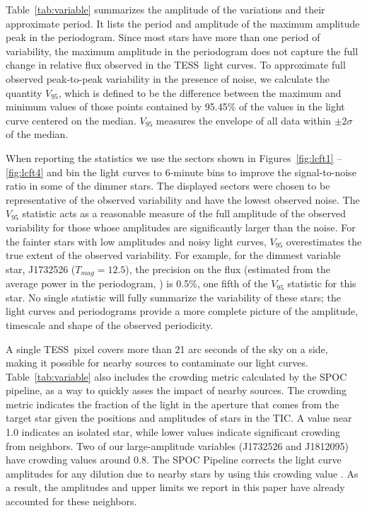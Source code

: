 \documentclass[twocolumn]{aastex631}
\newcommand{\tess}{TESS}
\begin{document}
Table~\ref{tab:variable} summarizes the amplitude of the variations and their approximate period.  It lists the period and amplitude of the maximum amplitude peak in the periodogram. Since most stars have more than one period of variability, the maximum amplitude in the periodogram does not capture the full change in relative flux observed in the \tess\ light curves. To approximate full observed peak-to-peak variability in the presence of noise, we calculate the quantity $V_{95}$, which is defined to be the difference between the maximum and minimum values of those points contained by 95.45\% of the values in the light curve centered on the median.  $V_{95}$ measures the envelope of all data within $\pm 2\sigma$ of the median. 


When reporting the statistics we use the sectors shown in Figures~\ref{fig:lcft1} -- \ref{fig:lcft4} and bin the light curves to 6-minute bins to improve the signal-to-noise ratio in some of the dimmer stars. The displayed sectors were chosen to be representative of the observed variability and have the lowest observed noise. The $V_{95}$ statistic acts as a reasonable measure of the full amplitude of the observed variability for those whose amplitudes are significantly larger than the noise.  For the fainter stars with low amplitudes and noisy light curves, $V_{95}$ overestimates the true extent of the observed variability. For example, for the dimmest variable star, J1732526 ($T_{mag}=12.5$), the precision on the flux (estimated from the average power in the periodogram, ) is 0.5\%, one fifth of the $V_{95}$ statistic for this star.  No single statistic will fully summarize the variability of these stars; the light curves and periodograms provide a more complete picture of the amplitude, timescale and shape of the observed periodicity.

A single \tess\ pixel covers more than 21 arc seconds of the sky on a side, making it possible for nearby sources to contaminate our light curves. Table~\ref{tab:variable} also includes the crowding metric calculated by the SPOC pipeline, as a way to quickly asses the impact of nearby sources. The crowding metric indicates the fraction of the light in the aperture that comes from the target star given the positions and amplitudes of stars in the TIC.  A value near 1.0 indicates an isolated star, while lower values indicate significant crowding from neighbors.  Two of our large-amplitude variables (J1732526 and J1812095) have crowding values around 0.8.  The SPOC Pipeline corrects the light curve amplitudes for any dilution due to nearby stars by using this crowding value \citep{FausnaughDRN}.  As a result, the amplitudes and upper limits we report in this paper have already accounted for these neighbors.
\end{document}
